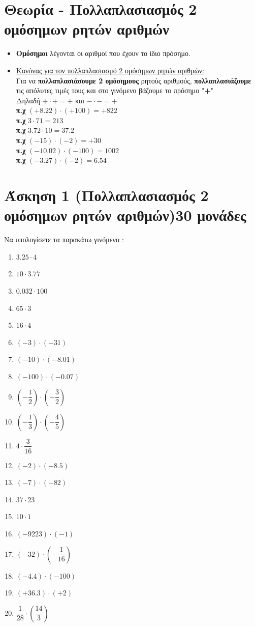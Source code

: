 \documentclass[a4paper,10pt]{report}
\begin{document}
\section*{Θεωρία - Πολλαπλασιασμός 2 ομόσημων ρητών αριθμών\hfill \small{}}
\begin{itemize}
 \item \textbf{Ομόσημοι} λέγονται οι αριθμοί που έχουν το ίδιο πρόσημο. 
 \item \underline{ Κανόνας για τον πολλαπλασιασμό 2 ομόσημων ρητών αριθμών:} \\
       Για να \textbf{πολλαπλασιάσουμε 2 ομόσημους} ρητούς αριθμούς, 
       \textbf{πολλαπλασιάζουμε} τις απόλυτες τιμές τους και στο γινόμενο βάζουμε το πρόσημο "\textbf{+}"\\
       Δηλαδή $+\cdot +=+$ και $-\cdot -=+$\\
       \textbf{π.χ} $(+8.22)\cdot(+100)=+822$\\
       \textbf{π.χ} $3\cdot71=213$\\
       \textbf{π.χ} $3.72\cdot 10=37.2$ \\
       \textbf{π.χ} $(-15)\cdot(-2)=+30$ \\
       \textbf{π.χ} $(-10.02)\cdot(-100)=1002$ \\
       \textbf{π.χ} $(-3.27)\cdot(-2)=6.54$ \\
\end{itemize}


\section*{Άσκηση 1  (Πολλαπλασιασμός 2 ομόσημων ρητών αριθμών)\hfill \small{30 μονάδες}}
Να υπολογίσετε τα παρακάτω γινόμενα :
\begin{multicols}{2}
\begin{enumerate}[1)]
 \item $3.25\cdot 4$
 \item $10\cdot 3.77$
 \item $0.032\cdot100$
 \item $65\cdot3$
 \item $16\cdot4$
 \item $(-3)\cdot(-31)$
 \item $(-10)\cdot(-8.01)$
 \item $(-100)\cdot(-0.07)$
 \item $(-\dfrac{1}{2})\cdot(-\dfrac{3}{2})$
 \item $(-\dfrac{1}{3})\cdot(-\dfrac{4}{5})$
 \item $4\cdot\dfrac{3}{16}$
 \item $(-2)\cdot(-8.5)$
 \item $(-7)\cdot(-82)$
 \item $37\cdot23$
 \item $10\cdot1$
 \item $(-9223)\cdot(-1)$
 \item $(-32)\cdot(-\dfrac{1}{16})$
 \item $(-4.4)\cdot(-100)$
 \item $(+36.3)\cdot(+2)$
 \item $\dfrac{1}{28}\cdot(\dfrac{14}{3})$
\end{enumerate}
\end{multicols}
\end{document}
